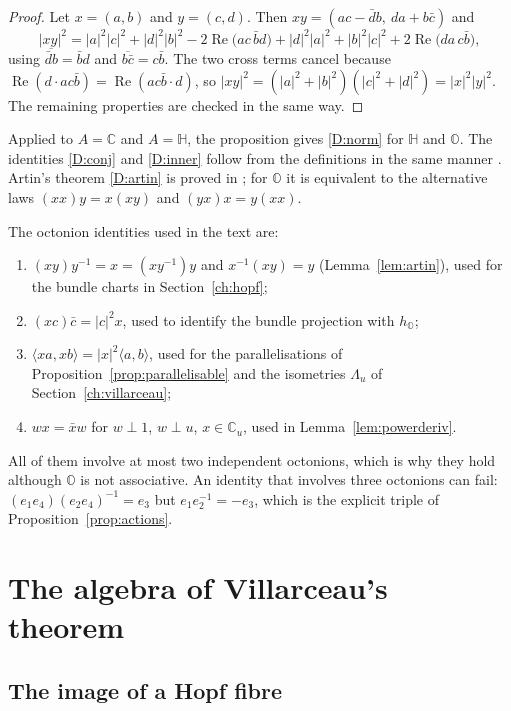 \documentclass[11pt]{amsart}
\numberwithin{equation}{section}
\theoremstyle{plain}
\theoremstyle{definition}
\theoremstyle{remark}
\newcommand{\C}{\mathbb{C}}
\newcommand{\Hq}{\mathbb{H}}
\newcommand{\Oc}{\mathbb{O}}
\renewcommand{\Re}{\operatorname{Re}}
\begin{document}
\begin{proof}
Let $x=(a,b)$ and $y=(c,d)$. Then $xy=(ac-\bar db,\ da+b\bar c)$ and
\[
|xy|^2=|a|^2|c|^2+|d|^2|b|^2-2\Re\bigl(ac\,\bar b d\bigr)+|d|^2|a|^2+|b|^2|c|^2+2\Re\bigl(da\,c\bar b\bigr),
\]
using $\overline{\bar db}=\bar bd$ and $\overline{b\bar c}=c\bar b$. The two cross terms cancel because $\Re(d\cdot ac\bar b)=\Re(ac\bar b\cdot d)$, so $|xy|^2=(|a|^2+|b|^2)(|c|^2+|d|^2)=|x|^2|y|^2$. The remaining properties are checked in the same way.
\end{proof}

Applied to $A=\C$ and $A=\Hq$, the proposition gives \ref{D:norm} for $\Hq$ and $\Oc$. The identities \ref{D:conj} and \ref{D:inner} follow from the definitions in the same manner \cite[Chapter~III]{Sch66}. Artin's theorem \ref{D:artin} is proved in \cite[Theorem~3.1]{Sch66}; for $\Oc$ it is equivalent to the alternative laws $(xx)y=x(xy)$ and $(yx)x=y(xx)$.

The octonion identities used in the text are:
\begin{enumerate}[label=(O\arabic*)]
\item $(xy)y^{-1}=x=(xy^{-1})y$ and $x^{-1}(xy)=y$ (Lemma~\ref{lem:artin}), used for the bundle charts in Section~\ref{ch:hopf};
\item $(xc)\bar c=|c|^2x$, used to identify the bundle projection with $h_\Oc$;
\item $\langle xa,xb\rangle=|x|^2\langle a,b\rangle$, used for the parallelisations of Proposition~\ref{prop:parallelisable} and the isometries $\Lambda_u$ of Section~\ref{ch:villarceau};
\item $wx=\bar xw$ for $w\perp1$, $w\perp u$, $x\in\C_u$, used in Lemma~\ref{lem:powerderiv}.
\end{enumerate}
All of them involve at most two independent octonions, which is why they hold although $\Oc$ is not associative. An identity that involves three octonions can fail: $(e_1e_4)(e_2e_4)^{-1}=e_3$ but $e_1e_2^{-1}=-e_3$, which is the explicit triple of Proposition~\ref{prop:actions}.

\section{The algebra of Villarceau's theorem}\label{app:villarceau}

\subsection{The image of a Hopf fibre}
\end{document}
